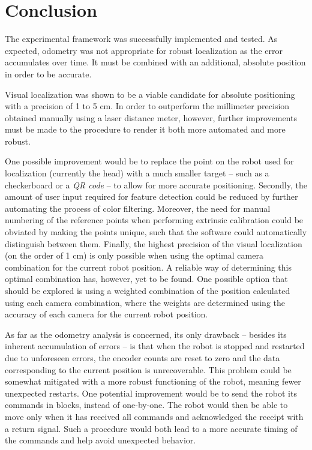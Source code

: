 
\section{Conclusion}

\setlength{\parskip}{1em}
The experimental framework was successfully implemented and tested. 
As expected, odometry was not appropriate for robust localization as the error accumulates over time. 
It must be combined with an additional, absolute position in order to be accurate.

Visual localization was shown to be a viable candidate for absolute positioning with a precision of 1 to 5 cm. 
In order to outperform the millimeter precision obtained manually using a laser distance meter, however, further improvements must be made to the procedure to render it both more automated and more robust. 

One possible improvement would be to replace the point on the robot used for localization (currently the head) with a much smaller target -- such as a checkerboard or a \textit{QR code} -- to allow for more accurate positioning. 
Secondly, the amount of user input required for feature detection could be reduced by further automating the process of color filtering. 
Moreover, the need for manual numbering of the reference points when performing extrinsic calibration could be obviated by making the points unique, such that the software could automatically distinguish between them.
Finally, the highest precision of the visual localization (on the order of 1 cm) is only possible when using the optimal camera combination for the current robot position. 
A reliable way of determining this optimal combination has, however, yet to be found. 
One possible option that should be explored is using a weighted combination of the position calculated using each camera combination, where the weights are determined using the accuracy of each camera for the current robot position.


As far as the odometry analysis is concerned, its only drawback -- besides its inherent accumulation of errors -- is that when the robot is stopped and restarted due to unforeseen errors, the encoder counts are reset to zero and the data corresponding to the current position is unrecoverable.
This problem could be somewhat mitigated with a more robust functioning of the robot, meaning fewer unexpected restarts.
One potential improvement would be to send the robot its commands in blocks, instead of one-by-one. 
The robot would then be able to move only when it has received all commands and acknowledged the receipt with a return signal. 
Such a procedure would both lead to a more accurate timing of the commands and help avoid unexpected behavior.

